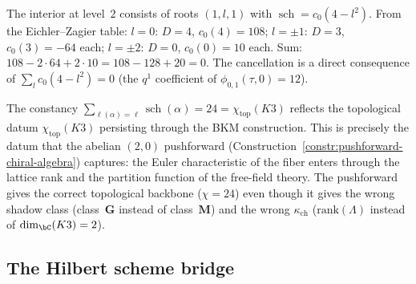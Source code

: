 \begin{remark}
\label{rem:level-2-cancellation}
The interior at level~$2$ consists of roots $(1, l, 1)$ with
$\operatorname{sch}=c_0(4 - l^2)$. From the Eichler--Zagier table:
$l = 0$: $D = 4$, $c_0(4) = 108$;
$l = \pm 1$: $D = 3$, $c_0(3) = -64$ each;
$l = \pm 2$: $D = 0$, $c_0(0) = 10$ each.
Sum: $108 - 2 \cdot 64 + 2 \cdot 10 = 108 - 128 + 20 = 0$.
The cancellation is a direct consequence of
$\sum_l c_0(4 - l^2) = 0$ (the $q^1$ coefficient of
$\phi_{0,1}(\tau, 0) = 12$).
\end{remark}

\begin{remark}
\label{rem:constancy-shadow}
The constancy $\sum_{\ell(\alpha) = \ell} \operatorname{sch}(\alpha)
= 24 = \chi_{\mathrm{top}}(K3)$ reflects the topological datum $\chi_{\mathrm{top}}(K3)$
persisting through the BKM construction. This is precisely the
datum that the abelian $(2,0)$ pushforward
(Construction~\ref{constr:pushforward-chiral-algebra}) captures:
the Euler characteristic of the fiber enters through the lattice
rank and the partition function of the free-field theory. The
pushforward gives the correct topological backbone
($\chi = 24$) even though it gives the wrong shadow class
(class~$\mathbf{G}$ instead of class~$\mathbf{M}$) and the wrong
$\kappa_{\mathrm{ch}}$ ($\mathrm{rank}(\Lambda)$ instead of
$\dim_\bC(K3) = 2$).
\end{remark}



\subsection{The Hilbert scheme bridge}
\label{subsec:bridge-hilbert-schemes}

